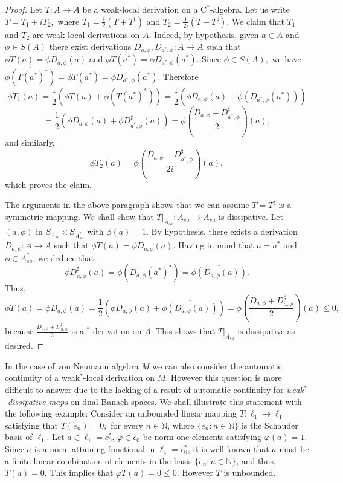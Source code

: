 \documentclass[11pt]{amsart}
\begin{document}
\begin{proof} Let $T: A\to A$ be a weak-local derivation on a C$^*$-algebra. Let us write $T = T_1 + i T_2,$ where $T_1 = \frac12 (T+ T^{\sharp})$ and $T_2 = \frac{1}{2 i} (T- T^{\sharp})$. We claim that $T_1$ and $T_2$ are weak-local derivations on $A$. Indeed, by hypothesis, given $a\in A$ and $\phi\in S(A)$ there exist derivations $D_{a,\phi}, D_{a^*,\phi}: A\to A$ such that $\phi T(a) = \phi D_{a,\phi}(a)$ and $\phi T(a^*) = \phi D_{a^*,\phi}(a^*)$. Since $\phi\in S(A),$ we have $\overline{\phi (T(a^*)^*)} = \phi T(a^*) = \phi D_{a^*,\phi}(a^*)$. Therefore $$\phi T_1 (a)  =  \frac12 \left(\phi T(a) + \phi (T(a^*)^*) \right)= \frac12 \left(\phi D_{a,\phi} (a) + \overline{\phi (D_{a^*,\phi} (a^*))} \right) $$ $$= \frac12 \left(\phi D_{a,\phi} (a) + \phi D_{a^*,\phi}^{\sharp} (a) \right) = \phi \left(\frac{D_{a,\phi} +  D_{a^*,\phi}^{\sharp} }{2}\right)  (a),$$ and similarly, $$\phi T_2 (a)  = \phi \left(\frac{D_{a,\phi} -  D_{a^*,\phi}^{\sharp} }{2i}\right)  (a),$$ which proves the claim.\smallskip

The arguments in the above paragraph shows that we can assume $T=T^{\sharp}$ is a symmetric mapping. We shall show that $T|_{A_{sa}} : A_{sa} \to A_{sa}$ is dissipative. Let $(a,\phi)$ in $S_{A_{sa}}\times S_{A_{sa}^*}$ with $\phi (a) = 1$. By hypothesis, there exists a derivation $D_{a,\phi}: A\to A$ such that $\phi T(a) = \phi D_{a,\phi}(a).$ Having in mind that $a=a^*$ and $\phi\in A_{sa}^*$, we deduce that $$\phi D_{a,\phi}^{\sharp} (a) = \phi (D_{a,\phi} (a^*)^*) = \overline{\phi (D_{a,\phi} (a))} .$$ Thus, $$\phi T(a) = \phi D_{a,\phi} (a) = \frac12 (\phi D_{a,\phi} (a) +  \overline{\phi (D_{a,\phi} (a))}) = \phi \left(\frac{D_{a,\phi} + D_{a,\phi}^{\sharp}}{2} \right) (a) \leq 0,$$ because $\frac{D_{a,\phi} + D_{a,\phi}^{\sharp}}{2}$ is a $^*$-derivation on $A$. This shows that $T|_{A_{sa}}$ is dissipative as desired.
\end{proof}

In the case of von Neumann algebra $M$ we can also consider the automatic continuity of a weak$^*$-local derivation on $M$. However this question is more difficult to answer due to the lacking of a result of automatic continuity for \emph{weak$^*$-dissipative maps} on dual Banach spaces. We shall illustrate this statement with the following example: Consider an unbounded linear mapping $T:\ell_1\to \ell_1$ satisfying that $T(e_n)=0,$ for every $n\in \mathbb{N}$, where $\{e_n: n\in \mathbb{N}\}$ is the Schauder basis of $\ell_1$. Let $a\in \ell_1= c_0^*$, $\varphi\in c_0$ be norm-one elements satisfying $\varphi(a) = 1$. Since $a$ is a norm attaining functional in $\ell_1= c_0^*$, it is well known that $a$ must be a finite linear combination of elements in the basis  $\{e_n: n\in \mathbb{N}\}$, and thus, $T(a) = 0$. This implies that $\varphi T(a) =0\leq 0.$ However $T$ is unbounded. \smallskip
\end{document}
